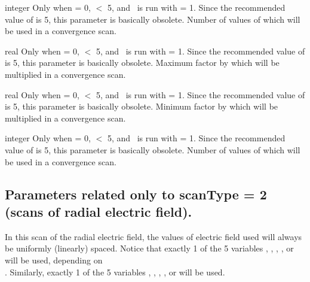 \myhrule

{integer}
{Only when  = 0,  $<$ 5, and \sfincsScan~is run with  = 1.
Since the recommended value of  is 5, this parameter is basically obsolete.}
{Number of values of  which will be used in a convergence scan.}

\myhrule

{real}
{Only when  = 0,  $<$ 5, and \sfincsScan~is run with  = 1.
Since the recommended value of  is 5, this parameter is basically obsolete.}
{Maximum factor by which  will be multiplied in a convergence scan.}

\myhrule

{real}
{Only when  = 0,  $<$ 5, and \sfincsScan~is run with  = 1.
Since the recommended value of  is 5, this parameter is basically obsolete.}
{Minimum factor by which  will be multiplied in a convergence scan.}

\myhrule

{integer}
{Only when  = 0,  $<$ 5, and \sfincsScan~is run with  = 1.
Since the recommended value of  is 5, this parameter is basically obsolete.}
{Number of values of  which will be used in a convergence scan.}




\subsection{Parameters related only to {\ttfamily scanType} = 2 (scans of radial electric field).}

In this scan of the radial electric field, the values of electric field used
will always be uniformly (linearly) spaced.  
Notice that exactly 1 of the 5 variables , , , , or 
will be used, depending on\\
.
Similarly, exactly 1 of the 5 variables
, , , , or 
will be used.

